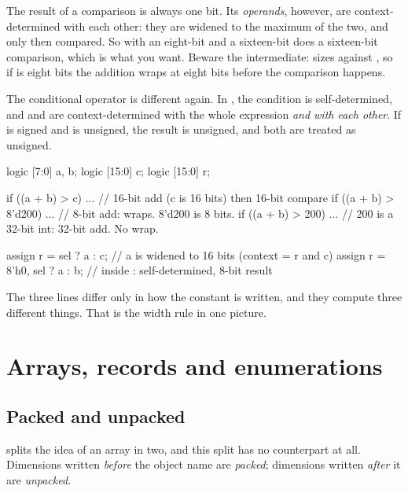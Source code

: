 The result of a comparison is always one bit. Its \emph{operands}, however, are
context-determined with each other: they are widened to the maximum of the two,
and only then compared. So  with an eight-bit  and a
sixteen-bit  does a sixteen-bit comparison, which is what you want.
Beware the intermediate:  sizes  against
, so if  is eight bits the addition wraps at eight bits before
the comparison happens.

The conditional operator is different again. In , the
condition is self-determined, and  and  are context-determined
with the whole expression \emph{and with each other}. If  is signed and
 is unsigned, the result is unsigned, and both are treated as unsigned.

\begin{svcode}[caption={Widths in comparisons and conditionals.},label={lst:rosetta:cmpwidth}]
logic  [7:0] a, b;
logic [15:0] c;
logic [15:0] r;

if ((a + b) > c)  ...   // 16-bit add (c is 16 bits) then 16-bit compare
if ((a + b) > 8'd200) ...  // 8-bit add: wraps. 8'd200 is 8 bits.
if ((a + b) > 200)    ...  // 200 is a 32-bit int: 32-bit add. No wrap.

assign r = sel ? a : c;     // a is widened to 16 bits (context = r and c)
assign r = {8'h0, sel ? a : b};  // inside {}: self-determined, 8-bit result
\end{svcode}

The three  lines differ only in how the constant is written, and they
compute three different things. That is the width rule in one picture.

\section{Arrays, records and enumerations}
\label{sec:rosetta:arrays}

\subsection{Packed and unpacked}


\SV{} splits the idea of an array in two, and this split has no \VHDL{}
counterpart at all. Dimensions written \emph{before} the object name are
\emph{packed}; dimensions written \emph{after} it are \emph{unpacked}.

